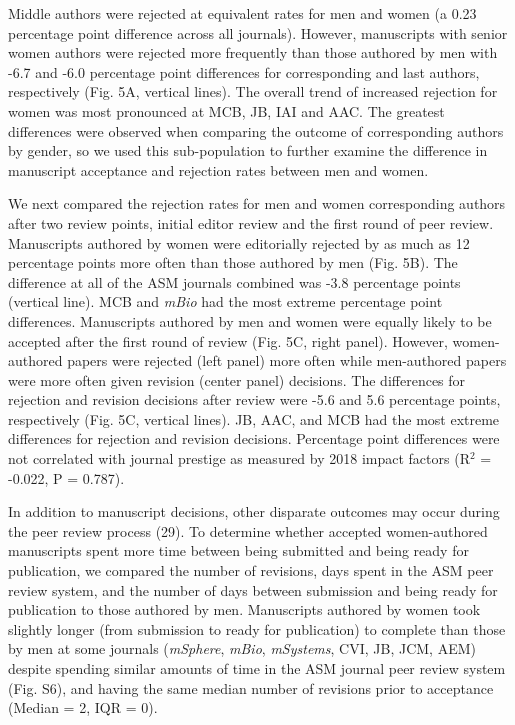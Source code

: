 \documentclass[11pt,]{article}
\begin{document}
Middle authors were rejected at equivalent rates for men and women (a
0.23 percentage point difference across all journals). However,
manuscripts with senior women authors were rejected more frequently than
those authored by men with -6.7 and -6.0 percentage point differences
for corresponding and last authors, respectively (Fig. 5A, vertical
lines). The overall trend of increased rejection for women was most
pronounced at MCB, JB, IAI and AAC. The greatest differences were
observed when comparing the outcome of corresponding authors by gender,
so we used this sub-population to further examine the difference in
manuscript acceptance and rejection rates between men and women.

We next compared the rejection rates for men and women corresponding
authors after two review points, initial editor review and the first
round of peer review. Manuscripts authored by women were editorially
rejected by as much as 12 percentage points more often than those
authored by men (Fig. 5B). The difference at all of the ASM journals
combined was -3.8 percentage points (vertical line). MCB and \emph{mBio}
had the most extreme percentage point differences. Manuscripts authored
by men and women were equally likely to be accepted after the first
round of review (Fig. 5C, right panel). However, women-authored papers
were rejected (left panel) more often while men-authored papers were
more often given revision (center panel) decisions. The differences for
rejection and revision decisions after review were -5.6 and 5.6
percentage points, respectively (Fig. 5C, vertical lines). JB, AAC, and
MCB had the most extreme differences for rejection and revision
decisions. Percentage point differences were not correlated with journal
prestige as measured by 2018 impact factors (R\({^2}\) = -0.022, P =
0.787).

In addition to manuscript decisions, other disparate outcomes may occur
during the peer review process (29). To determine whether accepted
women-authored manuscripts spent more time between being submitted and
being ready for publication, we compared the number of revisions, days
spent in the ASM peer review system, and the number of days between
submission and being ready for publication to those authored by men.
Manuscripts authored by women took slightly longer (from submission to
ready for publication) to complete than those by men at some journals
(\emph{mSphere}, \emph{mBio}, \emph{mSystems}, CVI, JB, JCM, AEM)
despite spending similar amounts of time in the ASM journal peer review
system (Fig. S6), and having the same median number of revisions prior
to acceptance (Median = 2, IQR = 0).
\end{document}
